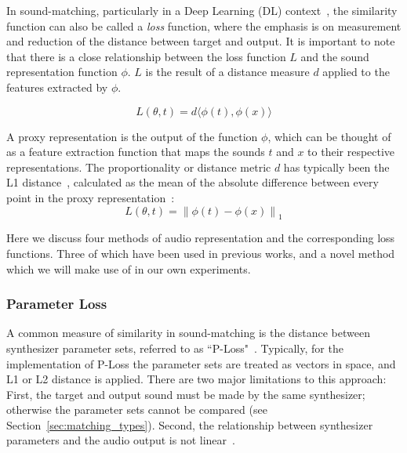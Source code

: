 \documentclass[lettersize,journal]{IEEEtran}
\providecommand{\gls}[1]{#1}
\begin{document}
In sound-matching, particularly in a Deep Learning (\gls{DL}) context~\cite{goodfellow2016deep}, the similarity function can also be called a \textit{loss} function, where the emphasis is on measurement and reduction of the distance between target and output. It is important to note that there is a close relationship between the loss function $L$ and the sound representation function $\phi$. $L$ is the result of a distance measure $d$ applied to the features extracted by $\phi$. 

\[
L(\theta, t) =  d\langle\phi(t),\phi(x)\rangle
\]

\noindent

A proxy representation is the output of the function \( \phi \), which can be thought of as a feature extraction function that maps the sounds \( t \) and \( x \) to their respective representations. 
The proportionality or distance metric $d$ has typically been the L1 distance~\cite{turian2020sorry}, calculated as the mean of the absolute difference between every point in the proxy representation~\cite{engel2020ddsp,vahidi2023mesostructures}:
\[
L(\theta, t) = \left\| \phi(t) - \phi(x) \right\|_1
\]

Here we discuss four methods of audio representation and the corresponding loss functions. Three of which have been used in previous works, and a novel method which we will make use of in our own experiments. 

\subsubsection{Parameter Loss}
A common measure of similarity in sound-matching is the distance between synthesizer parameter sets, referred to as ``P-Loss"~\cite{han2023perceptual}. Typically, for the implementation of P-Loss the parameter sets are treated as vectors in space, and L1 or L2 distance is applied. There are two major limitations to this approach: First, the target and output sound must be made by the same synthesizer; otherwise the parameter sets cannot be compared (see Section~\ref{sec:matching_types}). Second, the relationship between synthesizer parameters and the audio output is not linear~\cite{shier2020spiegelib,han2023perceptual,esling2019flow}. 
\end{document}
